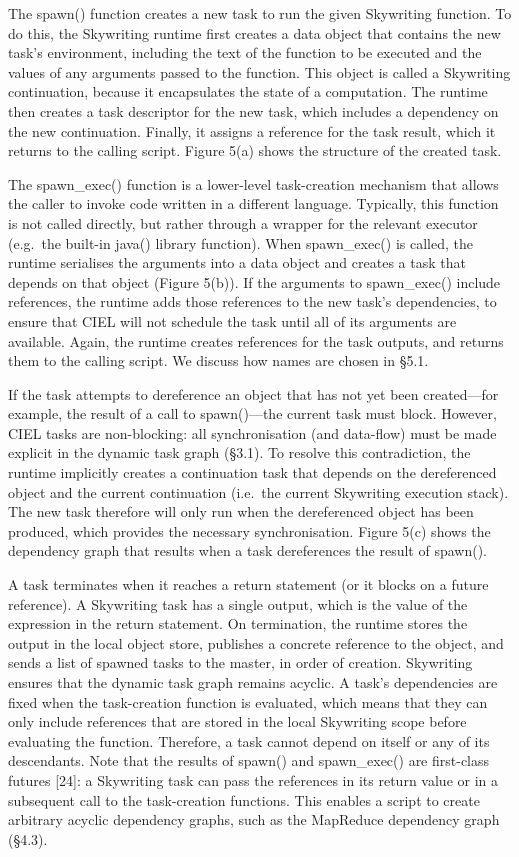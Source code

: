 \documentclass[
]{article}
\begin{document}
The spawn() function creates a new task to run the given Skywriting
function. To do this, the Skywriting runtime first creates a data object
that contains the new task's environment, including the text of the
function to be executed and the values of any arguments passed to the
function. This object is called a Skywriting continuation, because it
encapsulates the state of a computation. The runtime then creates a task
descriptor for the new task, which includes a dependency on the new
continuation. Finally, it assigns a reference for the task result, which
it returns to the calling script. Figure 5(a) shows the structure of the
created task.

The spawn\_exec() function is a lower-level task-creation mechanism that
allows the caller to invoke code written in a different language.
Typically, this function is not called directly, but rather through a
wrapper for the relevant executor (e.g.~the built-in java() library
function). When spawn\_exec() is called, the runtime serialises the
arguments into a data object and creates a task that depends on that
object (Figure 5(b)). If the arguments to spawn\_exec() include
references, the runtime adds those references to the new task's
dependencies, to ensure that CIEL will not schedule the task until all
of its arguments are available. Again, the runtime creates references
for the task outputs, and returns them to the calling script. We discuss
how names are chosen in §5.1.

If the task attempts to dereference an object that has not yet been
created---for example, the result of a call to spawn()---the current
task must block. However, CIEL tasks are non-blocking: all
synchronisation (and data-flow) must be made explicit in the dynamic
task graph (§3.1). To resolve this contradiction, the runtime implicitly
creates a continuation task that depends on the dereferenced object and
the current continuation (i.e.~the current Skywriting execution stack).
The new task therefore will only run when the dereferenced object has
been produced, which provides the necessary synchronisation. Figure 5(c)
shows the dependency graph that results when a task dereferences the
result of spawn().

A task terminates when it reaches a return statement (or it blocks on a
future reference). A Skywriting task has a single output, which is the
value of the expression in the return statement. On termination, the
runtime stores the output in the local object store, publishes a
concrete reference to the object, and sends a list of spawned tasks to
the master, in order of creation. Skywriting ensures that the dynamic
task graph remains acyclic. A task's dependencies are fixed when the
task-creation function is evaluated, which means that they can only
include references that are stored in the local Skywriting scope before
evaluating the function. Therefore, a task cannot depend on itself or
any of its descendants. Note that the results of spawn() and
spawn\_exec() are first-class futures {[}24{]}: a Skywriting task can
pass the references in its return value or in a subsequent call to the
task-creation functions. This enables a script to create arbitrary
acyclic dependency graphs, such as the MapReduce dependency graph
(§4.3).
\end{document}
